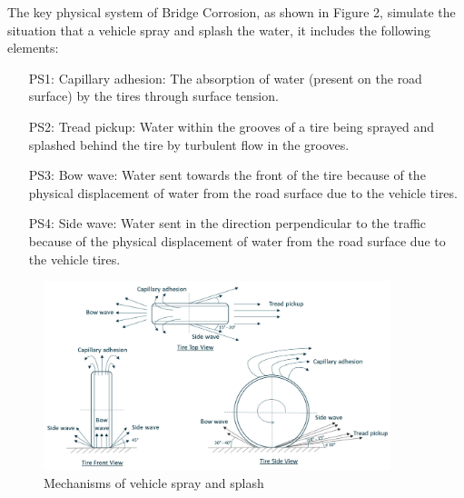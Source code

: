 \documentclass[12pt]{article}
\begin{document}
The key physical system of Bridge Corrosion, as shown in Figure 2, simulate the situation that a vehicle spray and splash the water, it includes the following elements:

\begin{itemize}

\item[PS1:] Capillary adhesion: The absorption of water (present on the road surface) by the tires through surface tension.

\item[PS2:] Tread pickup: Water within the grooves of a tire being sprayed and splashed behind the tire by turbulent flow in the grooves.

\item[PS3:] Bow wave: Water sent towards the front of the tire because of the physical displacement of water from the road surface due to the vehicle tires.

\item[PS4:] Side wave: Water sent in the direction perpendicular to the traffic because of the physical displacement of water from the road surface due to the vehicle tires.

\end{itemize}


\begin{figure}[h!]
\begin{center}
\includegraphics[width=0.9\textwidth]{phymodel}
\caption{\label{4mechanism} Mechanisms of vehicle spray and splash}

\end{center}
\end{figure}

\end{document}
